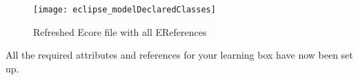 \begin{stepbystep}
\vspace{1cm}

\begin{figure}[htbp]
	\centering
  \texttt{[image: eclipse\_modelDeclaredClasses]}
	\caption{Refreshed Ecore file with all EReferences}
	\label{eclipse:model_allClasses}
\end{figure}

\vspace{1cm}

\item All the required attributes and references for your learning box have now been set up.


\end{stepbystep}
